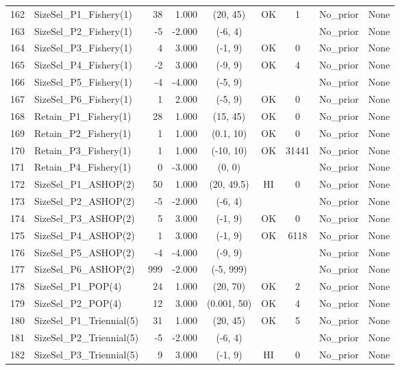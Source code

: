 \documentclass[12pt,]{article}
\begin{document}
\begin{landscape}
\begin{longtable}{rlrrcccll}
  162 & SizeSel\_P1\_Fishery(1) & 38 & 1.000 & (20, 45) & OK & 1 & No\_prior & None \\ 
  163 & SizeSel\_P2\_Fishery(1) & -5 & -2.000 & (-6, 4) &  &  & No\_prior & None \\ 
  164 & SizeSel\_P3\_Fishery(1) & 4 & 3.000 & (-1, 9) & OK & 0 & No\_prior & None \\ 
  165 & SizeSel\_P4\_Fishery(1) & -2 & 3.000 & (-9, 9) & OK & 4 & No\_prior & None \\ 
  166 & SizeSel\_P5\_Fishery(1) & -4 & -4.000 & (-5, 9) &  &  & No\_prior & None \\ 
  167 & SizeSel\_P6\_Fishery(1) & 1 & 2.000 & (-5, 9) & OK & 0 & No\_prior & None \\ 
  168 & Retain\_P1\_Fishery(1) & 28 & 1.000 & (15, 45) & OK & 0 & No\_prior & None \\ 
  169 & Retain\_P2\_Fishery(1) & 1 & 1.000 & (0.1, 10) & OK & 0 & No\_prior & None \\ 
  170 & Retain\_P3\_Fishery(1) & 1 & 1.000 & (-10, 10) & OK & 31441 & No\_prior & None \\ 
  171 & Retain\_P4\_Fishery(1) & 0 & -3.000 & (0, 0) &  &  & No\_prior & None \\ 
  172 & SizeSel\_P1\_ASHOP(2) & 50 & 1.000 & (20, 49.5) & HI & 0 & No\_prior & None \\ 
  173 & SizeSel\_P2\_ASHOP(2) & -5 & -2.000 & (-6, 4) &  &  & No\_prior & None \\ 
  174 & SizeSel\_P3\_ASHOP(2) & 5 & 3.000 & (-1, 9) & OK & 0 & No\_prior & None \\ 
  175 & SizeSel\_P4\_ASHOP(2) & 1 & 3.000 & (-1, 9) & OK & 6118 & No\_prior & None \\ 
  176 & SizeSel\_P5\_ASHOP(2) & -4 & -4.000 & (-9, 9) &  &  & No\_prior & None \\ 
  177 & SizeSel\_P6\_ASHOP(2) & 999 & -2.000 & (-5, 999) &  &  & No\_prior & None \\ 
  178 & SizeSel\_P1\_POP(4) & 24 & 1.000 & (20, 70) & OK & 2 & No\_prior & None \\ 
  179 & SizeSel\_P2\_POP(4) & 12 & 3.000 & (0.001, 50) & OK & 4 & No\_prior & None \\ 
  180 & SizeSel\_P1\_Triennial(5) & 31 & 1.000 & (20, 45) & OK & 5 & No\_prior & None \\ 
  181 & SizeSel\_P2\_Triennial(5) & -5 & -2.000 & (-6, 4) &  &  & No\_prior & None \\ 
  182 & SizeSel\_P3\_Triennial(5) & 9 & 3.000 & (-1, 9) & HI & 0 & No\_prior & None \\ 

\end{longtable}
\end{landscape}
\end{document}

